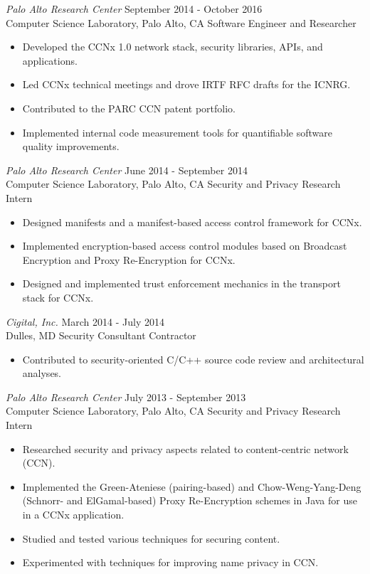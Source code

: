 \documentclass[10pt]{res}
\begin{document}
\begin{resume}
{\sl Palo Alto Research Center} \hfill September 2014 - October 2016 \\
Computer Science Laboratory, Palo Alto, CA \hfill Software Engineer and Researcher
\begin{itemize} \itemsep -2pt %
\item Developed the CCNx 1.0 network stack, security libraries, APIs, and applications.
\item Led CCNx technical meetings and drove IRTF RFC drafts for the ICNRG.
\item Contributed to the PARC CCN patent portfolio.
\item Implemented internal code measurement tools for quantifiable software quality improvements.
\end{itemize}

{\sl Palo Alto Research Center} \hfill June 2014 - September 2014 \\
Computer Science Laboratory, Palo Alto, CA \hfill Security and Privacy Research Intern
\begin{itemize} \itemsep -2pt %
\item Designed manifests and a manifest-based access control framework for CCNx.
\item Implemented encryption-based access control modules based on Broadcast Encryption and Proxy Re-Encryption for CCNx.
\item Designed and implemented trust enforcement mechanics in the transport stack for CCNx.
\end{itemize}

{\sl Cigital, Inc.} \hfill March 2014 - July 2014 \\
Dulles, MD \hfill Security Consultant Contractor
\begin{itemize} \itemsep -2pt %
\item Contributed to security-oriented C/C++ source code review and architectural analyses.
\end{itemize}

{\sl Palo Alto Research Center} \hfill July 2013 - September 2013 \\
Computer Science Laboratory, Palo Alto, CA \hfill Security and Privacy Research Intern
\begin{itemize} \itemsep -2pt %
\item Researched security and privacy aspects related to content-centric network (CCN).
\item Implemented the Green-Ateniese (pairing-based) and Chow-Weng-Yang-Deng (Schnorr- and ElGamal-based) Proxy Re-Encryption schemes in Java for use in a CCNx application.
\item Studied and tested various techniques for securing content.
\item Experimented with techniques for improving name privacy in CCN.
\end{itemize}


\end{resume}
\end{document}
